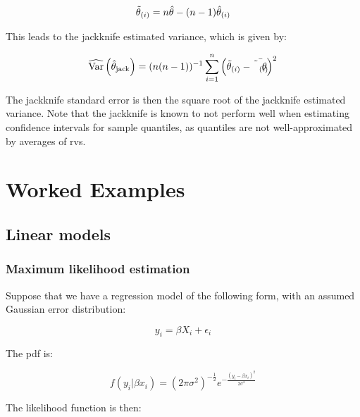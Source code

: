 \documentclass{report}
\begin{document}
\begin{equation}\label{eq:lst-jackknife-pseudovalue}
    \Tilde{\theta}_{(i)} = n\hat{\theta} - (n-1)\hat{\theta}_{(i)}
\end{equation}

This leads to the jackknife estimated variance, which is given by:

\begin{equation}\label{eq:lst-jackknife-variance-estimator}
    \widehat{\text{Var}}\left(\hat{\theta}_\text{jack}\right) = (n(n-1))^{-1} \sum_{i=1}^n \left(\Tilde{\theta}_{(i)} - \bar{\Tilde{\theta}_{(i)}}\right)^2
\end{equation}

The jackknife standard error is then the square root of the jackknife estimated variance. Note that the jackknife is known to not perform well when estimating confidence intervals for sample quantiles, as quantiles are not well-approximated by averages of \glspl{rv}. 

\chapter{Worked Examples} \label{chap:worked-examples}

\section{Linear models}\label{sec:examples-ols}

\subsection{Maximum likelihood estimation}

Suppose that we have a regression model of the following form, with an assumed Gaussian error distribution:

\begin{equation}\label{eq:ex-ols-model-form}
    y_i = \beta X_i + \epsilon_i
\end{equation}

The \gls{pdf} is:

\begin{equation}\label{eq:ex-ols-model-pdf}
    f(y_i | \beta x_i) = (2\pi\sigma^2)^{-\frac{1}{2}} e^{-\frac{(y_i - \beta x_i)^2}{2\sigma^2}}
\end{equation}

The likelihood function is then:
\end{document}
